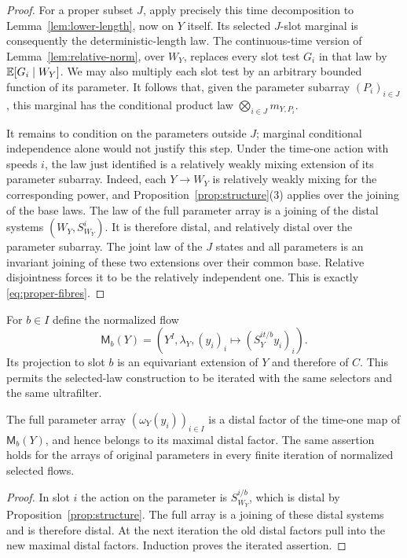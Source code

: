 \begin{proof}
For a proper subset $J$, apply precisely this time decomposition to
Lemma~\ref{lem:lower-length}, now on $Y$ itself.  Its selected
$J$-slot marginal is consequently the deterministic-length law.
The continuous-time version of Lemma~\ref{lem:relative-norm}, over
$W_Y$, replaces every slot test $G_i$ in that law by
$\mathbb E[G_i\mid W_Y]$.  We may also multiply each slot test by an
arbitrary bounded function of its parameter.  It follows that,
given the parameter subarray $(P_i)_{i\in J}$, this marginal has
the conditional product law $\bigotimes_{i\in J}m_{Y,P_i}$.

It remains to condition on the parameters outside $J$; marginal
conditional independence alone would not justify this step.
Under the time-one action with speeds $i$, the law just identified
is a relatively weakly mixing extension of its parameter subarray.
Indeed, each $Y\to W_Y$ is relatively weakly mixing for the
corresponding power, and Proposition~\ref{prop:structure}(3)
applies over the joining of the base laws.  The law of the full
parameter array is a joining of the distal systems
$(W_Y,S_{W_Y}^i)$.  It is therefore distal, and relatively distal
over the parameter subarray.  The joint law of the $J$ states and
all parameters is an invariant joining of these two extensions
over their common base.  Relative disjointness forces it to be
the relatively independent one.  This is exactly
\eqref{eq:proper-fibres}.
\end{proof}

For $b\in I$ define the normalized flow
\begin{equation}\label{eq:normalized-selected-flow}
 \mathsf M_b(Y)=
 \left(Y^I,\lambda_Y,
       (y_i)_i\longmapsto(S_Y^{it/b}y_i)_i\right).
\end{equation}
Its projection to slot $b$ is an equivariant extension of $Y$ and
therefore of $C$.  This permits the selected-law construction to be
iterated with the same selectors and the same ultrafilter.

\begin{lemma}
\label{lem:parameter-distal}
The full parameter array $(\omega_Y(y_i))_{i\in I}$ is a distal
factor of the time-one map of $\mathsf M_b(Y)$, and hence belongs
to its maximal distal factor.  The same assertion holds for the
arrays of original parameters in every finite iteration of
normalized selected flows.
\end{lemma}

\begin{proof}
In slot $i$ the action on the parameter is $S_{W_Y}^{i/b}$,
which is distal by Proposition~\ref{prop:structure}.  The full
array is a joining of these distal systems and is therefore distal.
At the next iteration the old distal factors pull into the new
maximal distal factors.  Induction proves the iterated assertion.
\end{proof}

